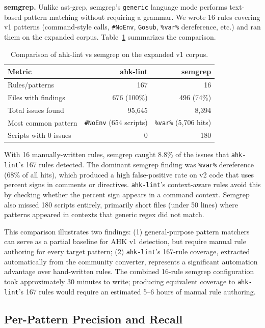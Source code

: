 \documentclass[11pt,a4paper]{article}
\begin{document}
\textbf{semgrep.} Unlike ast-grep, semgrep's \texttt{generic} language mode performs text-based pattern matching without requiring a grammar. We wrote 16 rules covering v1 patterns (command-style calls, \texttt{\#NoEnv}, \texttt{Gosub}, \texttt{\%var\%} dereference, etc.) and ran them on the expanded corpus. Table~\ref{tab:baseline} summarizes the comparison.

\begin{table}[h]
\centering\small
\caption{Comparison of ahk-lint vs semgrep on the expanded v1 corpus.}
\label{tab:baseline}
\begin{tabular}{lrr}
\toprule
\textbf{Metric} & \textbf{ahk-lint} & \textbf{semgrep} \\
\midrule
Rules/patterns & 167 & 16 \\
Files with findings & 676 (100\%) & 496 (74\%) \\
Total issues found & 95,645 & 8,394 \\
Most common pattern & \texttt{\#NoEnv} (654 scripts) & \texttt{\%var\%} (5,706 hits) \\
Scripts with 0 issues & 0 & 180 \\
\bottomrule
\end{tabular}
\end{table}

With 16 manually-written rules, semgrep caught 8.8\% of the issues that \texttt{ahk-lint}'s 167 rules detected. The dominant semgrep finding was \texttt{\%var\%} dereference (68\% of all hits), which produced a high false-positive rate on v2 code that uses percent signs in comments or directives. \texttt{ahk-lint}'s context-aware rules avoid this by checking whether the percent sign appears in a command context. Semgrep also missed 180 scripts entirely, primarily short files (under 50 lines) where patterns appeared in contexts that generic regex did not match.

This comparison illustrates two findings: (1) general-purpose pattern matchers can serve as a partial baseline for AHK v1 detection, but require manual rule authoring for every target pattern; (2) \texttt{ahk-lint}'s 167-rule coverage, extracted automatically from the community converter, represents a significant automation advantage over hand-written rules. The combined 16-rule semgrep configuration took approximately 30 minutes to write; producing equivalent coverage to \texttt{ahk-lint}'s 167 rules would require an estimated 5--6 hours of manual rule authoring.

\subsection{Per-Pattern Precision and Recall}
\end{document}
